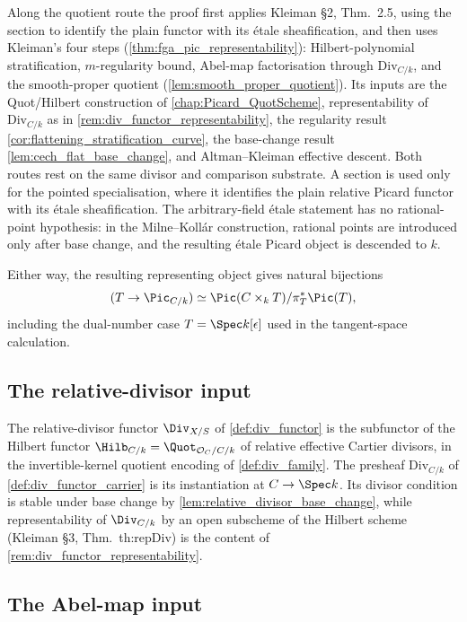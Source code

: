 Along the quotient route the proof first applies Kleiman \S 2, Thm.~2.5, using
the section to identify the plain functor with its \'etale sheafification, and
then uses Kleiman's four steps
(\cref{thm:fga_pic_representability}): Hilbert-polynomial stratification,
\(m\)-regularity bound, Abel-map factorisation through
\(\mathrm{Div}_{C/k}\), and the smooth-proper quotient
(\cref{lem:smooth_proper_quotient}). Its inputs are the Quot/Hilbert
construction of \cref{chap:Picard_QuotScheme}, representability of
\(\mathrm{Div}_{C/k}\) as in \cref{rem:div_functor_representability}, the
regularity result \cref{cor:flattening_stratification_curve}, the base-change
result \cref{lem:cech_flat_base_change}, and Altman--Kleiman effective descent.
Both routes rest on the same divisor and comparison substrate. A section is
used only for the pointed specialisation, where it identifies the plain
relative Picard functor with its \'etale sheafification. The arbitrary-field
\'etale statement has no rational-point hypothesis: in the Milne--Koll\'ar
construction, rational points are introduced only after base change, and the
resulting \'etale Picard object is descended to \(k\).

Either way, the resulting representing object gives
natural bijections
\[
  (T\to\Pic_{C/k})\simeq
  \Pic(C\times_kT)/\pi_T^*\Pic(T),
\]
including the dual-number case \(T=\Spec k[\epsilon]\) used in the
tangent-space calculation.

\subsection{The relative-divisor input}
\label{subsec:sorry_has_div_functor}

The relative-divisor functor \(\Div_{X/S}\) of
\cref{def:div_functor} is the subfunctor of the Hilbert functor
\(\Hilb_{C/k} = \Quot_{\mathcal{O}_C/C/k}\) of relative effective Cartier
divisors, in the invertible-kernel quotient encoding of
\cref{def:div_family}. The presheaf \(\mathrm{Div}_{C/k}\) of
\cref{def:div_functor_carrier} is its instantiation at
\(C\to\Spec k\). Its divisor condition is stable under base change by
\cref{lem:relative_divisor_base_change}, while representability of
\(\Div_{C/k}\) by an open subscheme of the Hilbert scheme (Kleiman \S 3,
Thm.~th:repDiv) is the content of
\cref{rem:div_functor_representability}.

\subsection{The Abel-map input}
\label{subsec:sorry_has_abel_map}


